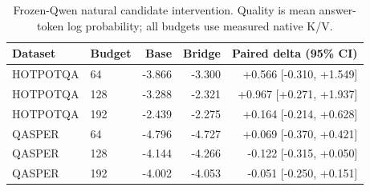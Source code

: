 \begin{table}[H]\centering\small
\begin{tabular}{llrrr}\toprule
Dataset & Budget & Base & Bridge & Paired delta (95\% CI) \\
\midrule
HOTPOTQA & 64 & -3.866 & -3.300 & +0.566 [-0.310, +1.549] \\
HOTPOTQA & 128 & -3.288 & -2.321 & +0.967 [+0.271, +1.937] \\
HOTPOTQA & 192 & -2.439 & -2.275 & +0.164 [-0.214, +0.628] \\
QASPER & 64 & -4.796 & -4.727 & +0.069 [-0.370, +0.421] \\
QASPER & 128 & -4.144 & -4.266 & -0.122 [-0.315, +0.050] \\
QASPER & 192 & -4.002 & -4.053 & -0.051 [-0.250, +0.151] \\
\bottomrule\end{tabular}
\caption{Frozen-Qwen natural candidate intervention. Quality is mean answer-token log probability; all budgets use measured native K/V.}
\label{tab:paper1-natural}
\end{table}
